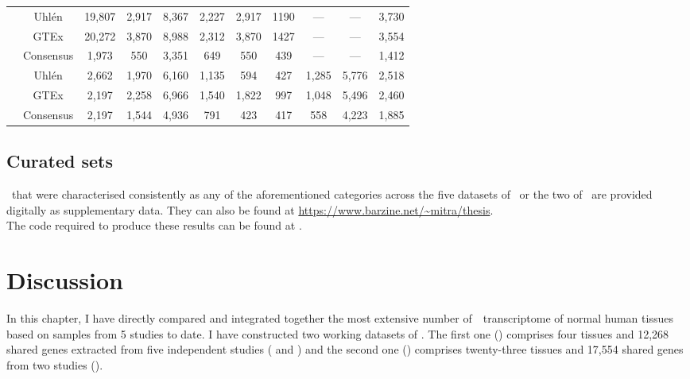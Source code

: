 \begin{landscape}
\begin{table}[]
\begin{tabular}{@{}ccccccccccc@{}}
& Uhlén & 19,807 & 2,917 & 8,367 & 2,227 &
2,917  & 1190  & --- & --- & 3,730  \\
& GTEx & 20,272 & 3,870 & 8,988  & 2,312 &
3,870  & 1427  & --- & --- & 3,554  \\
\cmidrule(l){2-11}
& Consensus & 1,973 & 550 & 3,351 & 649 &
550  & 439 & --- & --- & 1,412  \\
\midrule
\multirow{3}{*}{\rotatebox[origin=c]{90}{\parbox[c]{1.7cm}{\centering Common\\ 23
tissues\\ Working datasets}}} & Uhlén & 2,662  & 1,970  &
6,160 & 1,135 & 594  & 427 & 1,285 &
5,776 & 2,518 \\
& GTEx & 2,197 & 2,258 & 6,966  & 1,540 &
1,822  & 997 & 1,048 & 5,496  & 2,460 \\
\cmidrule(l){2-11}
& Consensus & 2,197 & 1,544 & 4,936 & 791 &
423 & 417 & 558 & 4,223 & 1,885 \\
\bottomrule
\end{tabular}
\end{table}
\end{landscape}
\pagestyle{scrheadings}


\subsection{Curated sets}\label{subsec:Trans_curatedSets}
\vspace{-6mm}
\Pcgs\ that were characterised consistently
as any of the aforementioned categories across the five datasets of \setOne\
or the two of \setTwo\
are provided digitally as supplementary data.
They can also be found at \url{https://www.barzine.net/~mitra/thesis}.
\\The code required to produce these results can be found at \github.

\vspace{-1.5mm}
\section{Discussion}\label{sec:Trans_discussion}
In this chapter,
I have directly compared and integrated together
the most extensive number of~\Rnaseq\ transcriptome
of normal human tissues based on samples from 5 studies to date.
I have constructed two working datasets of \pcgs.
The first one (\setOne) comprises four tissues
and 12,268 shared genes
extracted from five independent studies
(\cite{Krupp2012,VTpaper,Uhlen2015,GTExTranscript} and \ibm)
and the second one (\setTwo) comprises twenty-three tissues
and 17,554 shared genes
from two studies (\cite{Uhlen2015,GTExTranscript}).\\
\vspace{-\baselineskip}

